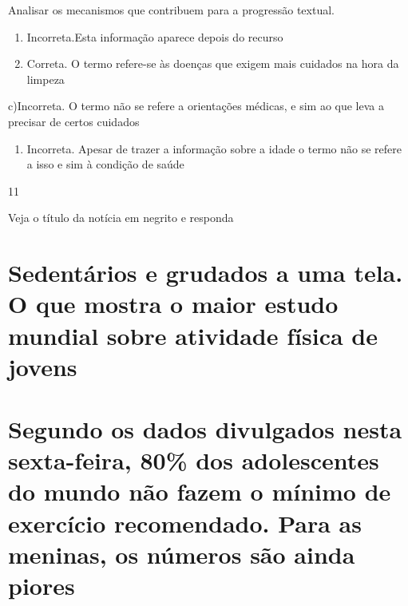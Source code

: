 {{\begin{itemize}
\begin{itemize}
Analisar os mecanismos que contribuem para a progressão textual.

\begin{enumerate}
\def\labelenumi{\arabic{enumi}.}
\item
  Incorreta.Esta informação aparece depois do recurso
\item
  Correta. O termo refere-se às doenças que exigem mais cuidados na hora
  da limpeza
\end{enumerate}

c)Incorreta. O termo não se refere a orientações médicas, e sim ao que
leva a precisar de certos cuidados

\begin{enumerate}
\def\labelenumi{\arabic{enumi}.}
\tightlist
\item
  Incorreta. Apesar de trazer a informação sobre a idade o termo não se
  refere a isso e sim à condição de saúde
\end{enumerate}

\num{11}

Veja o título da notícia em negrito e responda

\hypertarget{sedentuxe1rios-e-grudados-a-uma-tela.-o-que-mostra-o-maior-estudo-mundial-sobre-atividade-fuxedsica-de-jovens}{%
\section{\texorpdfstring{\textbf{Sedentários e grudados a uma tela. O
que mostra o maior estudo mundial sobre atividade física de
jovens}}{Sedentários e grudados a uma tela. O que mostra o maior estudo mundial sobre atividade física de jovens}}\label{sedentuxe1rios-e-grudados-a-uma-tela.-o-que-mostra-o-maior-estudo-mundial-sobre-atividade-fuxedsica-de-jovens}}

\hypertarget{segundo-os-dados-divulgados-nesta-sexta-feira-80-dos-adolescentes-do-mundo-nuxe3o-fazem-o-muxednimo-de-exercuxedcio-recomendado.-para-as-meninas-os-nuxfameros-suxe3o-ainda-piores}{%
\section{Segundo os dados divulgados nesta sexta-feira, 80\% dos
adolescentes do mundo não fazem o mínimo de exercício recomendado. Para
as meninas, os números são ainda
piores}\label{segundo-os-dados-divulgados-nesta-sexta-feira-80-dos-adolescentes-do-mundo-nuxe3o-fazem-o-muxednimo-de-exercuxedcio-recomendado.-para-as-meninas-os-nuxfameros-suxe3o-ainda-piores}}


\end{itemize}
\end{itemize}}}
